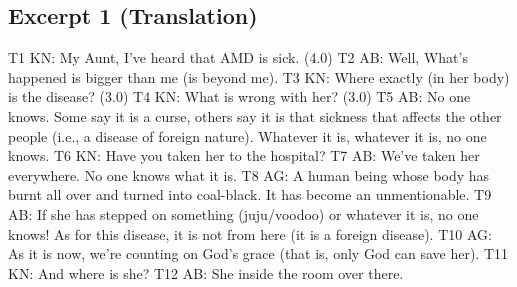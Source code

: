 \documentclass[output=paper,colorlinks,citecolor=brown]{langscibook}
\begin{document}
\subsection{Excerpt 1 (Translation)}

\begin{exe}
     T1 KN: My Aunt, I’ve heard that AMD is sick. (4.0)
     T2 AB: Well, What’s happened is bigger than me (is beyond me).
     T3 KN: Where exactly (in her body) is the disease? (3.0) 
     T4 KN: What is wrong with her? (3.0)
     T5 AB: No one knows. Some say it is a curse, others say it is that sickness that affects the other people (i.e., a disease of foreign nature). Whatever it is, whatever it is, no one knows.
     T6 KN: Have you taken her to the hospital?
     T7 AB: We’ve taken her everywhere. No one knows what it is.
     T8 AG: A human being whose body has burnt all over and turned into coal-black. It has become an unmentionable.
     T9 AB: If she has stepped on something (juju/voodoo) or whatever it is, no one knows! As for this disease, it is not from here (it is a foreign disease).
     T10 AG: As it is now, we’re counting on God’s grace (that is, only God can save her).
     T11 KN: And where is she?
     T12 AB: She inside the room over there.
\end{exe}

\end{document}

